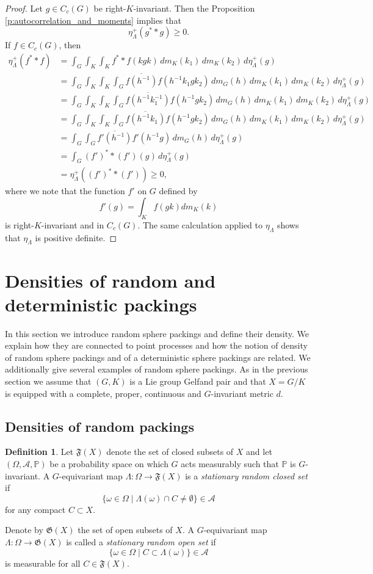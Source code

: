 \documentclass[12pt,reqno,a4paper]{amsart}
\theoremstyle{theorem}
\theoremstyle{definition}
\newtheorem{definition}[theorem]{Definition}
\numberwithin{theorem}{section}
\numberwithin{equation}{section}
\begin{document}
\begin{proof}
	Let $g\in C_c(G)$ be right-$K$-invariant. 
	Then the Proposition \ref{p:autocorrelation_and_moments} implies that 
	\[
	\eta_\Lambda^+(g^**g)\geq 0.
	\]
	If $f\in C_c(G)$, then 
	\begin{align*}
		\eta_\Lambda^+(f^**f) &= \int_G\int_K\int_K f^**f(kgk)\,dm_K(k_1)\,dm_K(k_2)\,d\eta_\Lambda^+(g)\\
		&= \int_G\int_K\int_K \int_G \overline{f(h^{-1})}f(h^{-1}k_1gk_2)\,dm_G(h)\,dm_K(k_1)\,dm_K(k_2)\,d\eta_\Lambda^+(g)\\
		&= \int_G\int_K\int_K \int_G \overline{f(h^{-1}k_1^{-1})}f(h^{-1}gk_2)\,dm_G(h)\,dm_K(k_1)\,dm_K(k_2)\,d\eta_\Lambda^+(g)\\
		&= \int_G \int_K\int_K\int_G \overline{f(h^{-1}k_1)}f(h^{-1}gk_2)\,dm_G(h)\,dm_K(k_1)\,dm_K(k_2)\,d\eta_\Lambda^+(g)\\
		&= \int_G \int_G \overline{f'(h^{-1})}f'(h^{-1}g)\,dm_G(h)\,d\eta_\Lambda^+(g)\\
		&= \int_G (f')^**(f')(g)\,d\eta_\Lambda^+(g)\\
		&= \eta_\Lambda^+((f')^**(f'))\geq 0,
	\end{align*}
	where we note that the function $f'$ on $G$ defined by
	\[
	f'(g)= \int_Kf(gk)dm_K(k)
	\]
	is right-$K$-invariant and in $C_c(G)$.
	The same calculation applied to $\eta_\Lambda$ shows that $\eta_\Lambda$ is positive definite.
\end{proof}
\section{Densities of random and deterministic packings}\label{s:deterministic_and_random_density}
In this section we introduce random sphere packings and define their density. We explain how they are connected to point processes and how the notion of density of random sphere packings and of a deterministic sphere packings are related.
We additionally give several examples of random sphere packings. As in the previous section we assume that $(G,K)$ is a Lie group Gelfand pair and that $X=G/K$ is equipped with a complete, proper, continuous and $G$-invariant metric $d$.
\subsection{Densities of random packings}
\begin{definition}
	Let $\mathfrak{F}(X)$ denote the set of closed subsets of $X$ and let $(\Omega, \mathcal{A} ,\mathbb{P})$ be a probability space on which $G$ acts measurably such that $\mathbb{P}$ is $G$-invariant.
	A $G$-equivariant map $\Lambda:\Omega\to \mathfrak{F}(X)$ is a \emph{stationary random closed set} if 
	\[\{\omega\in \Omega\mid \Lambda(\omega)\cap C \neq \emptyset\}\in \mathcal{A}\]
	for any compact $C\subset X$.
	
	Denote by $\mathfrak{G}(X)$ the set of open subsets of $X$. A $G$-equivariant map $\Lambda:\Omega\to \mathfrak{G}(X)$ is called a \emph{stationary random open set} if 
	\[\{\omega\in \Omega\mid C\subset \Lambda(\omega)\}\in \mathcal{A}\] 
	is measurable for all $C\in \mathfrak{F}(X)$.
\end{definition}
\end{document}
